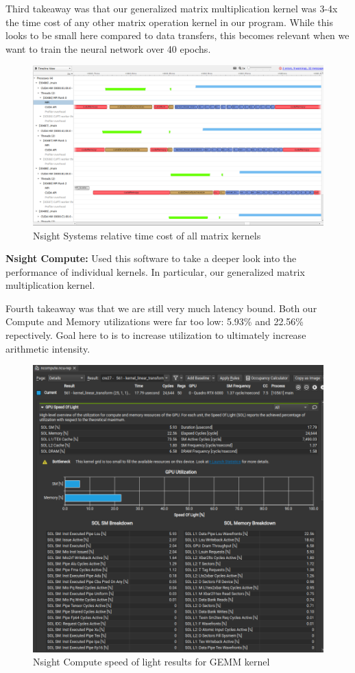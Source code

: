 \documentclass[12pt,letterpaper,twoside]{article}
\begin{document}
Third takeaway was that our generalized matrix multiplication kernel was 3-4x the time 
cost of any other matrix operation kernel in our program. While this looks to be small 
here compared to data transfers, this becomes relevant when we want to train the neural 
network over 40 epochs.

\begin{figure}[!htbp]
    \centering
    \includegraphics[scale=0.4]{nsight_systems_kernels.png}
    \caption{Nsight Systems relative time cost of all matrix kernels}
\end{figure}


\textbf{Nsight Compute:} Used this software to take a deeper look into the performance of 
individual kernels. In particular, our generalized matrix multiplication kernel.

Fourth takeaway was that we are still very much latency bound. Both our Compute and Memory
utilizations were far too low: 5.93\% and 22.56\% repectively. Goal here to is to increase 
utilization to ultimately increase arithmetic intensity. 

\begin{figure}[!htbp]
    \centering
    \includegraphics[scale=0.5]{nsight_compute_sol.png}
    \caption{Nsight Compute speed of light results for GEMM kernel}
\end{figure}
\end{document}
